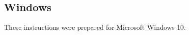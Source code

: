 \begin{comment}
\subsubsection{Release 10.0}

Install the following packages:
\begin{itemize}
 \item python
 \item scons
 \item boost-python-libs
 \item bash
 \item netcdf
 \item silo
 \item py27-scipy
 \item py27-gdal
 \item py27-matplotlib
 \item py27-pyproj
 \item py27-sympy
\end{itemize}

\noindent Next choose (or create) your options file.
For the setup as above the escript source comes with a prepared file in
\texttt{scons/templates/freebsd10.0_options.py}.
Finally to build escript issue the following in the escript source directory
(replace the options file as required):
\begin{shellCode}
scons -j4 options_file=scons/templates/freebsd10.0_options.py
\end{shellCode}

\emph{Note:} Some packages installed above are built with gcc 4.7. Somewhere
in the toolchain a system-installed gcc library is pulled in which is
incompatible with the one from version 4.7 and would prevent escript from
executing successfully. As explained in the FreeBSD
documentation\footnote{see \url{http://www.freebsd.org/doc/en/articles/custom-gcc/article.html}}
this can be fixed by adding a line to \texttt{/etc/libmap.conf}:
\begin{shellCode}
libgcc_s.so.1 gcc47/libgcc_s.so.1
\end{shellCode}

\end{comment}
\subsection{Windows}\label{sec:windowssrc}

\noindent These instructions were prepared for Microsoft Windows 10.

